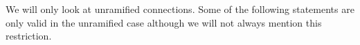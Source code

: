 We will only look at unramified connections. Some of the following statements
are only valid in the unramified case although we will not always mention this
restriction.

\begin{comment}
  \begin{defn}
    \marginnote{\cite[0.12.2]{sabbah2007isomonodromic}}
    The connection $\nabla:\sM\to \Omega_M^1\otimes_{\cO_M}\sM$ is said to be
    \emph{integrable} or \emph{flat}, if its curvature vanishes, i.e.\
    $R_\nabla\equiv0$
    where $R_\nabla:=\nabla\circ\nabla:\cE\to\Omega_M^2\otimes_{\cO_M}\cE$ is a
    $\cO_M$-linear morphism.
    \begin{s-rem}
      Here are all connections flat, since all connections will be of Dimension
      one.
    \end{s-rem}
  \end{defn}
\end{comment}

